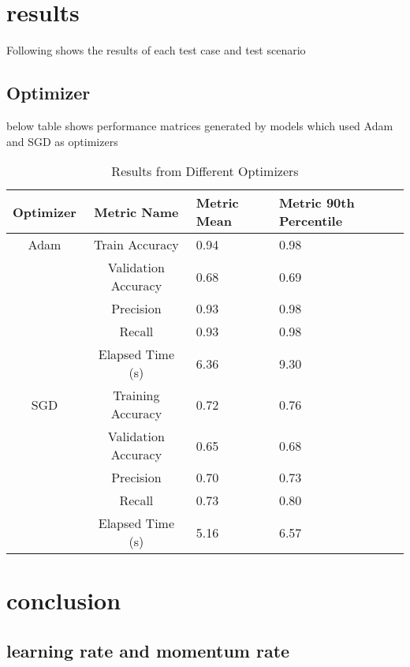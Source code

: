 \documentclass{article}
\begin{document}
\section{results}

Following shows the results of each test case and test scenario
\subsection{Optimizer}

below table shows performance matrices generated by models which used Adam and SGD as optimizers 
\begin{table}[h]
\begin{center}
\begin{tabular}{ |c|c|p{1.5cm}|p{2cm}|} 
\hline
Optimizer & Metric Name & Metric Mean & Metric 90th Percentile\\
\hline
Adam & Train Accuracy & 0.94 & 0.98\\ 
& Validation Accuracy & 0.68 & 0.69\\ 
& Precision & 0.93 & 0.98 \\ 
& Recall & 0.93 & 0.98 \\ 
& Elapsed Time (s) & 6.36 & 9.30 \\
\hline
SGD & Training Accuracy & 0.72 & 0.76\\ 
& Validation Accuracy & 0.65 & 0.68 \\ 
& Precision & 0.70 & 0.73 \\ 
& Recall & 0.73 & 0.80 \\ 
& Elapsed Time (s) & 5.16 & 6.57 \\
\hline
\end{tabular}
\caption{Results from Different Optimizers}
\label{tab:results_opt}
\end{center}
\end{table}
\section{conclusion}

\subsection{learning rate and momentum rate}
\end{document}
